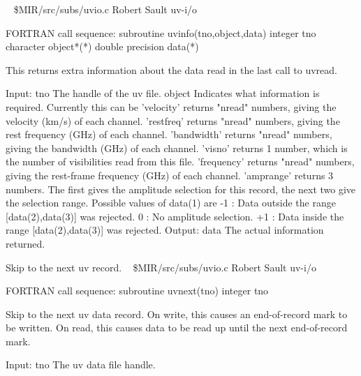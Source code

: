 \newline \ 
\newline {} \$MIR/src/subs/uvio.c
\newline {} Robert Sault
\newline {} uv-i/o
\par{\tenpoint
{\eightpoint\begintt
FORTRAN call sequence:
        subroutine uvinfo(tno,object,data)
        integer tno
        character object*(*)
        double precision data(*)

  This returns extra information about the data read in the last call
  to uvread.

  Input:
    tno         The handle of the uv file.
    object      Indicates what information is required. Currently
                this can be
                'velocity' returns "nread" numbers, giving the velocity
                           (km/s) of each channel.
                'restfreq' returns "nread" numbers, giving the rest
                           frequency (GHz) of each channel.
                'bandwidth' returns "nread" numbers, giving the bandwidth
                           (GHz) of each channel.
                'visno'    returns 1 number, which is the number of
                           visibilities read from this file.
                'frequency' returns "nread" numbers, giving the rest-frame
                           frequency (GHz) of each channel.
                'amprange' returns 3 numbers. The first gives the amplitude
                           selection for this record, the next two give
                           the selection range. Possible values of data(1) are
                           -1 : Data outside the range [data(2),data(3)]
                                was rejected.
                            0 : No amplitude selection.
                           +1 : Data inside the range [data(2),data(3)]
                                was rejected.
  Output:
    data        The actual information returned.                        
\endtt}
\par}
%
\noindent Skip to the next uv record.
\newline \ 
\newline {} \$MIR/src/subs/uvio.c
\newline {} Robert Sault
\newline \abox{Keywords:} uv-i/o
\par{\tenpoint
{\eightpoint\begintt
FORTRAN call sequence:
        subroutine uvnext(tno)
        integer tno

  Skip to the next uv data record. On write, this causes an end-of-record
  mark to be written. On read, this causes data to be read up until the
  next end-of-record mark.

  Input:
    tno         The uv data file handle.                                
\endtt}
\par}
